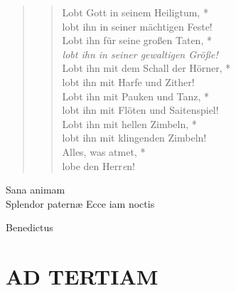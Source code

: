 \begin{quote}
\begin{verse}
 Lobt Gott in seinem Heiligtum, *\\
lobt ihn in seiner mächtigen Feste! \\
\vin Lobt ihn für seine großen Taten, *\\
\vin \textit{lobt ihn in seiner gewaltigen Größe!}\\
Lobt ihn mit dem Schall der Hörner, *\\
lobt ihn mit Harfe und Zither! \\
\vin Lobt ihn mit Pauken und Tanz, *\\
\vin lobt ihn mit Flöten und Saitenspiel! \\
Lobt ihn mit hellen Zimbeln, *\\
lobt ihn mit klingenden Zimbeln!\\
\vin Alles, was atmet, *\\
\vin lobe den Herr\textit{e}n!\\

\end{verse}
\end{quote}


\noindent{} Sana animam \\
\noindent{} Splendor paternæ  Ecce iam noctis 
\begin{flushleft}


\medskip

{\rm{
}}
\end{flushleft}

\def\greinitialformat#1{{\fontsize{40}{40}\selectfont #1}}
\gresetfirstlineaboveinitial{\small \textcolor{red}{Benedic.}}{}
\setaboveinitialseparation{0.72mm}


\vspace{0.3cm}
 Benedictus 


\section[HORA TERTIA]{AD TERTIAM}

